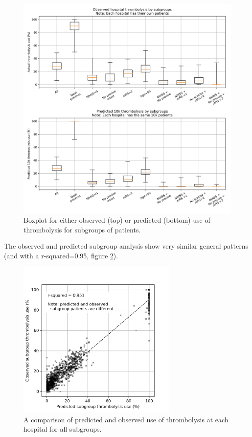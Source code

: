 \begin{figure}
\centering
\includegraphics[width=1\textwidth]{./images/15a_actual_vs_modelled_subgroup_violin}
\caption{Boxplot for either observed (top) or predicted (bottom) use of thrombolysis for subgroups of patients.}
\label{fig:subgroup_boxplot}
\end{figure}

The observed and predicted subgroup analysis show very similar general patterns (and with a r-squared=0.95, figure \ref{fig:subgroup_correlation}).

\begin{figure}
\centering
\includegraphics[width=0.7\textwidth]{./images/15a_subgroup_correlation}
\caption{A comparison of predicted and observed use of thrombolysis at each hospital for all subgroups.}
\label{fig:subgroup_correlation}
\end{figure}

